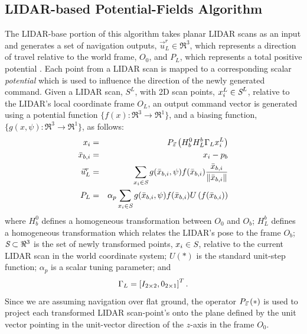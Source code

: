 		\subsection{LIDAR-based Potential-Fields Algorithm}

			The LIDAR-base portion of this algorithm takes  planar LIDAR scans as an input and generates a set of navigation outputs, $\vec{u}^{r}_{L} \in \Re^{3}$, which represents a direction of travel relative to the world frame, $O_{0}$, and $P_{L}$, which represents a total positive potential . Each point from a LIDAR scan is mapped to a corresponding scalar \emph{potential} which is used to influence the direction of the newly generated command. Given a LIDAR scan, $S^{L}$, with 2D scan points, $x_{i}^{L}\in\emph{S}^{L}$, relative to the LIDAR's local coordinate frame $O_{L}$, an output command vector is generated using a potential function $\{ f(x) : \Re^{3}\rightarrow \Re^{1} \}$, and a biasing function, $\{ g(x,\psi) : \Re^{3}\rightarrow \Re^{1} \}$, as follows:
				\begin{eqnarray}
				x_{i}  &=& P_{ \vec{z} } \left( H_{b}^{0} H_{L}^{b} \Gamma_{L} x_{i}^{L} \right) \nonumber\\
				\bar{x}_{b,i} &=&  x_{i}-p_{b} \nonumber \\
				\vec{u}^{r}_{L} &=&  { \sum_{x_{i} \in \emph{S}} g( \bar{x}_{b,i},\psi)  f( \bar{x}_{b,i} ) \frac{\bar{x}_{b,i}}{\left\lVert\bar{x}_{b,i}\right\rVert} } \nonumber \\
				P_{L} & = & \alpha_{p}\sum_{x_{i} \in \emph{S}} g( \bar{x}_{b,i},\psi)  f( \bar{x}_{b,i} ) U\left(f( \bar{x}_{b,i} )\right)
				\end{eqnarray}
			where $H_{b}^{0}$ defines a homogeneous transformation between $O_{0}$ and $O_{b}$; $H_{L}^{b}$ defines a homogeneous transformation which relates the LIDAR's pose to the frame $O_{b}$; $\emph{S}\subset \Re^{3}$ is the set of newly transformed points, $x_{i} \in \emph{S}$, relative to the current LIDAR scan in the world coordinate system; $U(*)$ is the standard unit-step function;  $\alpha_{p}$ is a scalar tuning parameter; and 
				\begin{equation*}
					\Gamma_{L} = \left[ I_{2\times2}, 0_{2\times1} \right]^{T}.
				\end{equation*}
			Since we are assuming navigation over flat ground, the operator $P_{ \vec{z} }\left(*\right)$ is used to project each transformed LIDAR scan-point's onto the plane defined by the unit vector pointing in the unit-vector direction of the $z$-axis in the frame $O_{0}$.

